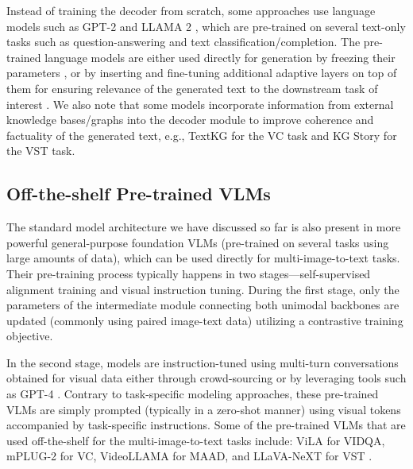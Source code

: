Instead of training the decoder from scratch, some approaches use language models such as GPT-2 \cite{gpt2} and \textsc{LLAMA 2} \cite{llama2}, which are pre-trained on several text-only tasks such as question-answering and text classification/completion. The pre-trained language models are either used directly for generation by freezing their parameters \cite{maad1,maad2,maad3}, or by inserting and fine-tuning additional adaptive layers on top of them for ensuring relevance of the generated text to the downstream task of interest \cite{vist_tapm}. We also note that some models incorporate information from external knowledge bases/graphs into the decoder module to improve coherence and factuality of the generated text, e.g., TextKG \cite{vc_textkg} for the \color{xkcdVividBlue}VC \color{black} task and KG Story \cite{vist_kg2} for the \color{xkcdVividBlue}VST \color{black} task.

\subsection{Off-the-shelf Pre-trained VLMs}
\label{sec:4_4}

The standard model architecture we have discussed so far is also present in more powerful general-purpose foundation VLMs (pre-trained on several tasks using large amounts of data), which can be used directly for multi-image-to-text tasks. Their pre-training process typically happens in two stages---self-supervised alignment training and visual instruction tuning. During the first stage, only the parameters of the intermediate module connecting both unimodal backbones are updated (commonly using paired image-text data) utilizing a contrastive training objective.

In the second stage, models are instruction-tuned using multi-turn conversations obtained for visual data either through crowd-sourcing or by leveraging tools such as GPT-4 \cite{gpt4}. Contrary to task-specific modeling approaches, these pre-trained VLMs are simply prompted (typically in a zero-shot manner) using visual tokens accompanied by task-specific instructions. Some of the pre-trained VLMs that are used off-the-shelf for the multi-image-to-text tasks include: ViLA for \color{xkcdVividBlue}VIDQA\color{black}, mPLUG-2 for \color{xkcdVividBlue}VC\color{black}, VideoLLAMA for \color{xkcdVividBlue}MAAD\color{black}, and LLaVA-NeXT for \color{xkcdVividBlue}VST \color{black} \cite{videoqa_vila,mplug2,maad4,nytws}.